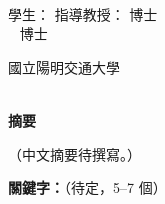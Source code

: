 \begin{center}
    \large
    \begin{singlespace}    
        \textbf{\chineseTitle{}} \\[0.5cm]
    \end{singlespace}

    \begin{singlespace}    
    學生：\studentCnName  \hspace{2.5cm}  指導教授：\advisorCnName \hspace{0.1cm} 博士 \\

    \ifdefined\advisorCnNameB %
        \hspace{9.6cm}  \advisorCnNameB ~ 博士 \\
    \fi
    \end{singlespace}

    \vspace{0.5cm}

    \begin{singlespace}
        國立陽明交通大學\\
        \NameofDepartmentInstituteCN\\[0.2cm]
    \end{singlespace}

    \textbf{摘\hspace{1cm}要} \\[0.5cm]

\end{center}

\normalsize 

（中文摘要待撰寫。）

\vspace{1cm}

\textbf{關鍵字：}（待定，5--7 個）
